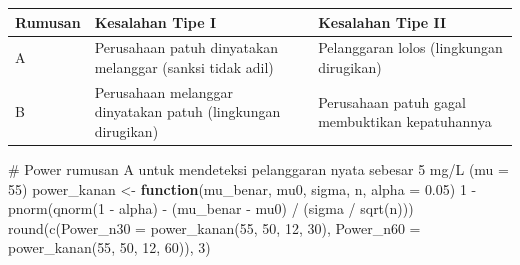 \documentclass[
  indonesian,
  letterpaper,
]{book}
\newenvironment{Shaded}{\begin{snugshade}}{\end{snugshade}}
\newcommand{\AttributeTok}[1]{\textcolor[rgb]{0.40,0.45,0.13}{#1}}
\newcommand{\CommentTok}[1]{\textcolor[rgb]{0.37,0.37,0.37}{#1}}
\newcommand{\ControlFlowTok}[1]{\textcolor[rgb]{0.00,0.23,0.31}{\textbf{#1}}}
\newcommand{\DecValTok}[1]{\textcolor[rgb]{0.68,0.00,0.00}{#1}}
\newcommand{\FloatTok}[1]{\textcolor[rgb]{0.68,0.00,0.00}{#1}}
\newcommand{\FunctionTok}[1]{\textcolor[rgb]{0.28,0.35,0.67}{#1}}
\newcommand{\NormalTok}[1]{\textcolor[rgb]{0.00,0.23,0.31}{#1}}
\newcommand{\OtherTok}[1]{\textcolor[rgb]{0.00,0.23,0.31}{#1}}
\newcommand{\SpecialCharTok}[1]{\textcolor[rgb]{0.37,0.37,0.37}{#1}}
\newcounter{none} %
\begin{document}
{\def\LTcaptype{none} %
\begin{longtable}[]{@{}
  >{\centering\arraybackslash}p{}
  >{\raggedright\arraybackslash}p{}
  >{\raggedright\arraybackslash}p{}@{}}
\toprule\noalign{}
\begin{minipage}[b]{\linewidth}\centering
Rumusan
\end{minipage} & \begin{minipage}[b]{\linewidth}\raggedright
Kesalahan Tipe I
\end{minipage} & \begin{minipage}[b]{\linewidth}\raggedright
Kesalahan Tipe II
\end{minipage} \\
\midrule\noalign{}
\endhead
\bottomrule\noalign{}
\endlastfoot
A & Perusahaan patuh dinyatakan melanggar (sanksi tidak adil) &
Pelanggaran lolos (lingkungan dirugikan) \\
B & Perusahaan melanggar dinyatakan patuh (lingkungan dirugikan) &
Perusahaan patuh gagal membuktikan kepatuhannya \\
\end{longtable}
}

\begin{Shaded}
\begin{Highlighting}[]
\CommentTok{\# Power rumusan A untuk mendeteksi pelanggaran nyata sebesar 5 mg/L (mu = 55)}
\NormalTok{power\_kanan }\OtherTok{\textless{}{-}} \ControlFlowTok{function}\NormalTok{(mu\_benar, mu0, sigma, n, }\AttributeTok{alpha =} \FloatTok{0.05}\NormalTok{)}
  \DecValTok{1} \SpecialCharTok{{-}} \FunctionTok{pnorm}\NormalTok{(}\FunctionTok{qnorm}\NormalTok{(}\DecValTok{1} \SpecialCharTok{{-}}\NormalTok{ alpha) }\SpecialCharTok{{-}}\NormalTok{ (mu\_benar }\SpecialCharTok{{-}}\NormalTok{ mu0) }\SpecialCharTok{/}\NormalTok{ (sigma }\SpecialCharTok{/} \FunctionTok{sqrt}\NormalTok{(n)))}
\FunctionTok{round}\NormalTok{(}\FunctionTok{c}\NormalTok{(}\AttributeTok{Power\_n30 =} \FunctionTok{power\_kanan}\NormalTok{(}\DecValTok{55}\NormalTok{, }\DecValTok{50}\NormalTok{, }\DecValTok{12}\NormalTok{, }\DecValTok{30}\NormalTok{), }\AttributeTok{Power\_n60 =} \FunctionTok{power\_kanan}\NormalTok{(}\DecValTok{55}\NormalTok{, }\DecValTok{50}\NormalTok{, }\DecValTok{12}\NormalTok{, }\DecValTok{60}\NormalTok{)), }\DecValTok{3}\NormalTok{)}
\end{Highlighting}
\end{Shaded}
\end{document}
